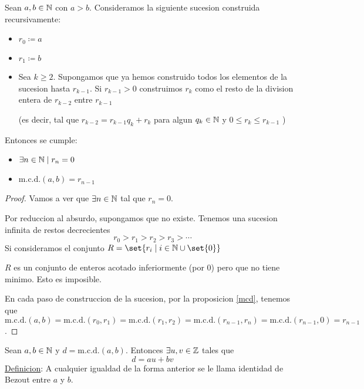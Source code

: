 \begin{theorem}
	Sean \(a,b \in \mathbb{N} \) con \(a > b \). Consideramos la siguiente sucesion construida recursivamente:
	\begin{itemize}
		\item \(r_0 \coloneqq a \)
		\item \(r_1 \coloneqq b \)
		\item Sea \(k \geq 2 \). Supongamos que ya hemos construido todos los elementos de la sucesion hasta \(r_{k-1}.\) Si \(r_{k-1} > 0 \)  construimos \(r_k \) como el resto de la division entera de \(r_{k-2}\) entre \(r_{k-1}\)
		      
		      (es decir, tal que \(r_{k-2} = r_{k-1}q_k + r_k \) para algun \(q_k \in \mathbb{N} \) y \(0 \leq r_k \leq  r_{k-1}\) )
	\end{itemize}
	Entonces se cumple:
	\begin{itemize}
		\item \(\exists  n \in \mathbb{N} \mid r_n = 0 \)
		\item \(\mathrm{m.c.d.}(a,b) = r_{n-1} \)
	\end{itemize}
\end{theorem}

\vspace{0.5cm}
\begin{proof}
	Vamos a ver que \(\exists n \in \mathbb{N} \) tal que \(r_n = 0 \).
	
	Por reduccion al absurdo, supongamos que no existe. Tenemos una sucesion infinita de restos decrecientes
	\[
		r_0 > r_1 > r_2 > r_3 > \cdots
	\]
	Si consideramos el conjunto \(R = \set{r_i \mid i \in \N \cup \set{0}}\)
	
	\(R \) es un conjunto de enteros acotado inferiormente (por 0) pero que no tiene minimo. Esto es imposible.
	
	En cada paso de construccion de la sucesion, por la proposicion \ref{mcd}, tenemos que \(\mathrm{m.c.d.}(a,b) = \mathrm{m.c.d.}(r_0,r_1) = \mathrm{m.c.d.}(r_1,r_2) = \mathrm{m.c.d.}(r_{n-1}, r_n ) = \mathrm{m.c.d.}(r_{n-1}, 0 ) = r_{n-1}\).
\end{proof}

\begin{theorem}
	Sean \(a,b \in \mathbb{N} \) y \(d = \mathrm{m.c.d.}(a,b) \). Entonces \(\exists u,v \in \mathbb{Z} \) tales que
	\[
		d = au + bv
	\]
	\underline{Definicion}: A cualquier igualdad de la forma anterior se le llama identidad de Bezout entre \(a \) y \(b \).
\end{theorem}

